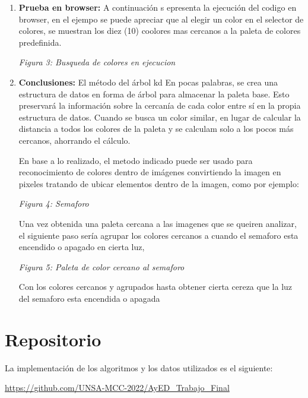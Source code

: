 \documentclass{article}
\begin{document}
\begin{enumerate}
    \item \textbf{Prueba en browser:} A continuación s epresenta la ejecución del codigo en browser, en el ejempo se puede apreciar que al elegir un color en el selector de colores, se muestran los diez (10) coolores mas cercanos a la paleta de colores predefinida.

    \begin{center}
        \par
        \textit{Figura 3: Busqueda de colores en ejecucion}
    \end{center}
  
    \item \textbf{Conclusiones:}  El método del árbol kd En pocas palabras, se crea una estructura de datos en forma de árbol para almacenar la paleta base. Esto preservará la información sobre la cercanía de cada color entre sí en la propia estructura de datos. Cuando se busca un color similar, en lugar de calcular la distancia a todos los colores de la paleta y se calculam solo a los pocos más cercanos, ahorrando el cálculo.

    En base a lo realizado, el metodo indicado puede ser usado para reconocimiento de colores dentro de imágenes convirtiendo la imagen en pixeles tratando de ubicar elementos dentro de la imagen, como por ejemplo:

    \begin{center}
        \par
        \textit{Figura 4: Semaforo}
    \end{center}

    Una vez obtenida una paleta cercana a las imagenes que se queiren analizar, el siguiente paso sería agrupar los colores cercanos a cuando el semaforo esta encendido o apagado en cierta luz, 

    \begin{center}
        \par
        \textit{Figura 5: Paleta de color cercano al semaforo}
    \end{center}

    Con los colores cercanos y agrupados hasta obtener cierta cereza que la luz del semaforo esta encendida o apagada


    \end{enumerate}
    
    \section{Repositorio}\label{sec:codigo}
        La implementación de los algoritmos y los datos utilizados es el siguiente:\par
	    \par
	    \begin{center}
	        \url{https://github.com/UNSA-MCC-2022/AyED_Trabajo_Final}
	    \end{center}
\end{document}
